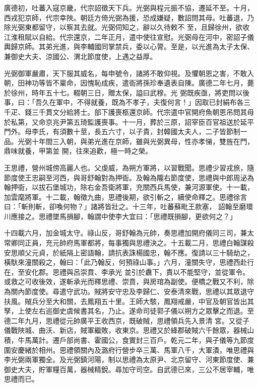 \begin{pinyinscope}
 廣德初，吐蕃入寇京畿，代宗詔徵天下兵。光弼與程元振不協，遷延不至。十月，西戎犯京師，代宗幸陜。朝廷方倚光弼為援，恐成嫌疑，數詔問其母。吐蕃退，乃除光弼東都留守，以察其去就。光弼伺知之，辭以久待敕不
 至，且歸徐州，欲收江淮租賦以自給。代宗還京，二年正月，遣中使往宣慰。光弼母在河中，密詔子儀輿歸京師。其弟光進，與李輔國同掌禁兵，委以心膂。至是，以光進為太子太保、兼御史大夫、涼國公、渭北節度使，上遇之益厚。



 光弼御軍嚴肅，天下服其威名，每申號令，諸將不敢仰視。及懼朝恩之害，不敢入朝，田神功等皆不稟命，因愧恥成疾，遣衙將孫珍奉遺表自陳。廣德二年七月，薨於徐州，時年五十七。輟朝三日，贈太保，謚曰武穆。光
 弼既疾亟，將吏問以後事，曰：「吾久在軍中，不得就養，既為不孝子，夫復何言！」因取已封絹布各三千疋、錢三千貫文分給將士。部下護喪柩還京師。代宗遣中官開府魚朝恩吊問其母於私第，又命京兆尹第五琦監護喪事。十一月，葬於三原，詔宰臣百官祖送於延平門外。母李氏，有須數十莖，長五六寸，以子貴，封韓國太夫人，二子皆節制一品。光弼十年間三入朝，與弟光進在京師，雖與光弼異母，性亦孝悌，雙旌在門，鼎味就養，甲第並
 開，往來追歡，極一時之榮。



 王思禮，營州城傍高麗人也。父虔威，為朔方軍將，以習戰聞。思禮少習戎旅，隨節度使王忠嗣至河西，與哥舒翰對為押衙。及翰為隴右節度使，思禮與中郎周泌為翰押衙，以拔石堡城功，除右金吾衛將軍，充關西兵馬使，兼河源軍使。十一載，加雲麾將軍。十二載，翰徵九曲，思禮後期，欲引斬之，續使命釋之。思禮徐言曰：「斬則斬，卻喚何物？」諸將皆壯之。十三年，吐蕃蘇毗王款塞，
 詔翰至磨環川應接之。思禮墜馬損腳，翰謂中使李大宜曰：「思禮既損腳，更欲何之？」



 十四載六月，加金城太守。祿山反，哥舒翰為元帥，奏思禮加開府儀同三司，兼太常卿同正員，充元帥府馬軍都將，每事獨與思禮決之。十五載二月，思禮白翰謀殺安思順父元貞，於紙隔上密語翰，請抗表誅楊國忠，翰不應。復請以三十騎劫之，橫馱來潼關殺之，翰曰：「此乃翰反，何預祿山事。」六月，潼關失守，思禮西赴行在，至安化郡。思禮與呂崇賁、李承光
 並引於纛下，責以不能堅守，並從軍令。或救之可收後效，遂斬承光而釋思禮、崇賁，與房琯為副使。便橋之戰又不利，除為關內節度使。尋遣守武功。賊將安守忠及李歸仁、安泰清來戰，思禮以其眾退守扶風。賊兵分至大和關，去鳳翔五十里。王師大駭，鳳翔戒嚴，中官及朝官皆出其孥，上使左右巡御史虞候書其名，乃止。遂命司徒郭子儀以朔方之眾擊之而退。至德二年九月，思禮從元帥廣平王收西京，既破賊，思禮領兵先入景清
 宮。又從子儀戰陜城、曲沃、新店，賊軍繼敗，收東京。思禮又於絳郡破賊六千餘眾，器械山積，牛馬萬計。遷戶部尚書、霍國公，食實封三百戶。乾元二年，與子儀等九節度圍安慶緒於相州。思禮領關內及潞府行營步卒三萬、馬軍八千，大軍潰，唯思禮與李光弼兩軍獨全。及光弼鎮河陽，制以思禮為太原尹、北京留守、河東節度使、兼御史大夫，貯軍糧百萬，器械精銳。尋加守司空。自武德已來，三公不居宰輔，唯思禮而已。




\end{pinyinscope}
